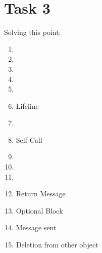 \chapter{Task 3}
\begin{parlist}
	\item 
	\item 
	\item 
	\item
	\item
	\item
	\item
	\item Solving this point:
	\begin{enumerate}
		\item  
		\item 
		\item
		\item
		\item
		\item Lifeline
		\item
		\item Self Call
		\item
		\item
		\item
		\item Return Message
		\item Optional Block
		\item Message sent
		\item Deletion from other object
	\end{enumerate}
\end{parlist}
